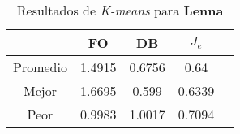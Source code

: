 \begin{table}[h!]
\footnotesize
\begin{center}
\begin{tabular}{|c|c|c|c|c|}
\hline
&{\bf FO}&{\bf DB}&{\bf $J_e$}\\
\hline
\hline
Promedio & 1.4915 & 0.6756 & 0.64\\
\hline
Mejor & 1.6695 & 0.599 & 0.6339\\
\hline
Peor & 0.9983 & 1.0017 & 0.7094\\
\hline
\end{tabular}
\caption{Resultados de \emph{K-means} para {\bf Lenna}}
\label{tb:pmpkmeanscsv}
\end{center}
\end{table}
